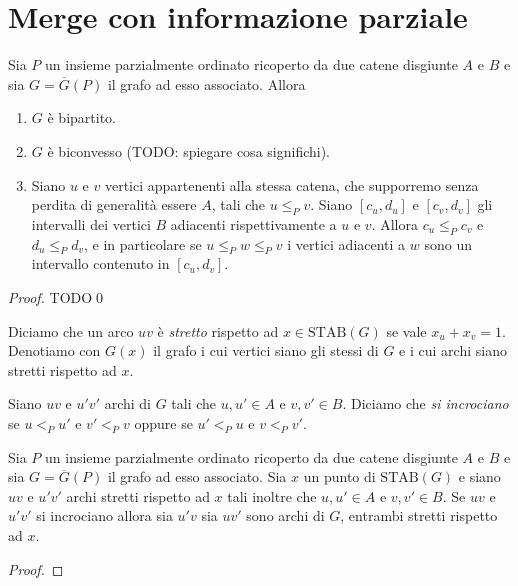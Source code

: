 {\section{Merge con informazione parziale} 
\begin{lemma}
	\label{structurelemma} Sia \(P\) un insieme parzialmente ordinato ricoperto da due catene disgiunte \(A\) e \(B\) e sia \(G=\overline{G}(P)\) il grafo ad esso associato. Allora 
	\begin{enumerate}
		\item \(G\) è bipartito. 
		\item \(G\) è biconvesso (TODO: spiegare cosa significhi). 
		\item Siano \(u\) e \(v\) vertici appartenenti alla stessa catena, che supporremo senza perdita di generalità essere \(A\), tali che \(u\le_{P} v\). Siano \([c_u,d_u]\) e \([c_v,d_v]\) gli intervalli dei vertici \(B\) adiacenti rispettivamente a \(u\) e \(v\). Allora \(c_u\le_{P} c_v\) e \(d_u\le_{P} d_v\), e in particolare se \(u\le_{P}w\le_{P}v\) i vertici adiacenti a \(w\) sono un intervallo contenuto in \([c_u,d_v]\). 
	\end{enumerate}
\end{lemma}
\begin{proof}
	TODO\qed 
\end{proof}
\begin{definition}
	Diciamo che un arco \(uv\) è \emph{stretto} rispetto ad \(x\in\text{STAB}(G)\) se vale \(x_u+x_v=1\). Denotiamo con \(G(x)\) il grafo i cui vertici siano gli stessi di \(G\) e i cui archi siano stretti rispetto ad \(x\). 
\end{definition}
\begin{definition}
	Siano \(uv\) e \(u'v'\) archi di \(G\) tali che \(u,u'\in A\) e \(v,v'\in B\). Diciamo che \emph{si incrociano} se \(u<_{P}u'\) e \(v'<_{P}v\) oppure se \(u'<_{P}u\) e \(v<_{P}v'\). 
\end{definition}
\begin{lemma}
	\label{crossinglemma} Sia \(P\) un insieme parzialmente ordinato ricoperto da due catene disgiunte \(A\) e \(B\) e sia \(G=\overline{G}(P)\) il grafo ad esso associato. Sia \(x\) un punto di \(\text{STAB}(G)\) e siano \(uv\) e \(u'v'\) archi stretti rispetto ad \(x\) tali inoltre che \(u,u'\in A\) e \(v,v'\in B\). Se \(uv\) e \(u'v'\) si incrociano allora sia \(u'v\) sia \(uv'\) sono archi di \(G\), entrambi stretti rispetto ad \(x\). 
\end{lemma}
\begin{proof}

\end{proof}}
